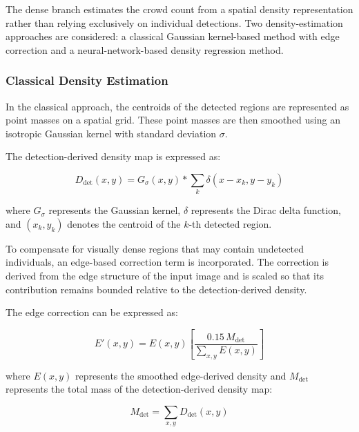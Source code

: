 \documentclass[12pt,a4paper]{report}
\begin{document}
The dense branch estimates the crowd count from a spatial density
representation rather than relying exclusively on individual detections.
Two density-estimation approaches are considered: a classical Gaussian
kernel-based method with edge correction and a neural-network-based density
regression method.


\subsubsection{Classical Density Estimation}

In the classical approach, the centroids of the detected regions are
represented as point masses on a spatial grid. These point masses are then
smoothed using an isotropic Gaussian kernel with standard deviation
$\sigma$.

The detection-derived density map is expressed as:

\begin{equation}
D_{\mathrm{det}}(x,y)
=
G_{\sigma}(x,y)
*
\sum_{k}
\delta(x-x_k,y-y_k)
\label{eq:detection-density-map}
\end{equation}

where $G_{\sigma}$ represents the Gaussian kernel, $\delta$ represents the
Dirac delta function, and $(x_k,y_k)$ denotes the centroid of the $k$-th
detected region.

To compensate for visually dense regions that may contain undetected
individuals, an edge-based correction term is incorporated. The correction
is derived from the edge structure of the input image and is scaled so that
its contribution remains bounded relative to the detection-derived density.

The edge correction can be expressed as:

\begin{equation}
E'(x,y)
=
E(x,y)
\left[
\frac{0.15\,M_{\mathrm{det}}}
{\sum_{x,y}E(x,y)}
\right]
\label{eq:edge-correction}
\end{equation}

where $E(x,y)$ represents the smoothed edge-derived density and
$M_{\mathrm{det}}$ represents the total mass of the detection-derived
density map:

\begin{equation}
M_{\mathrm{det}}
=
\sum_{x,y}
D_{\mathrm{det}}(x,y)
\label{eq:detection-mass}
\end{equation}
\end{document}
